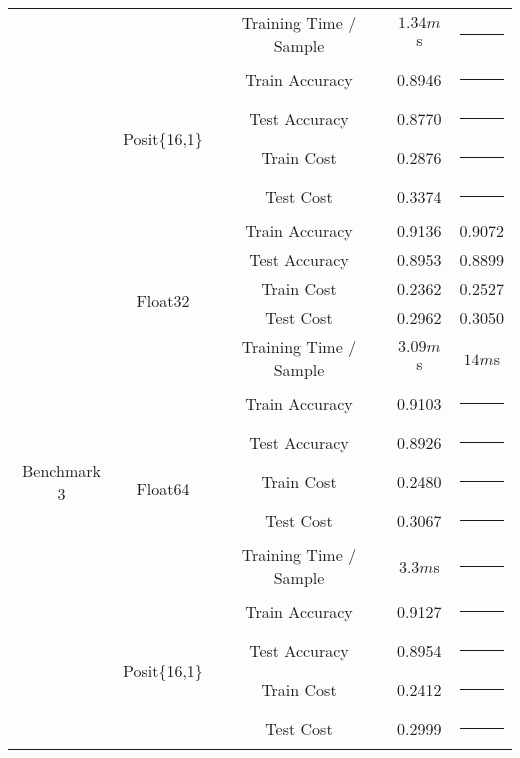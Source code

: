 \begin{table}[!ht]
\begin{tabular}{|c | c | c || c | c |}
		& & Training Time / Sample & $1.34m$s & \rule{5em}{1pt} \\\cline{2-5}
		& \multirow{4}{*}{Posit\{16,1\}} & Train Accuracy & 0.8946 & \rule{5em}{1pt} \\
		& & Test Accuracy & 0.8770 & \rule{5em}{1pt} \\
		& & Train Cost & 0.2876 & \rule{5em}{1pt} \\
		& & Test Cost & 0.3374 & \rule{5em}{1pt} \\\hline
		\multirow{14}{*}{Benchmark 3\footref{batchnorm}} & \multirow{5}{*}{Float32} & Train Accuracy & 0.9136 & 0.9072\\
		& & Test Accuracy & 0.8953 & 0.8899\\
		& & Train Cost & 0.2362 & 0.2527\\
		& & Test Cost & 0.2962 & 0.3050\\
		& & Training Time / Sample & $3.09m$s & $14m$s\\\cline{2-5}
		& \multirow{5}{*}{Float64} & Train Accuracy & 0.9103 & \rule{5em}{1pt} \\
		& & Test Accuracy & 0.8926 & \rule{5em}{1pt} \\
		& & Train Cost & 0.2480 & \rule{5em}{1pt} \\
		& & Test Cost & 0.3067 & \rule{5em}{1pt} \\
		& & Training Time / Sample & $3.3m$s & \rule{5em}{1pt} \\\cline{2-5}
		& \multirow{4}{*}{Posit\{16,1\}} & Train Accuracy & 0.9127 & \rule{5em}{1pt} \\
		& & Test Accuracy & 0.8954 & \rule{5em}{1pt} \\
		& & Train Cost & 0.2412 & \rule{5em}{1pt} \\
		& & Test Cost & 0.2999 & \rule{5em}{1pt} \\\hline		
	\end{tabular}
\end{table}


